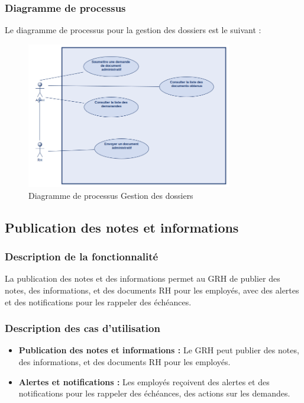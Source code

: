 \subsubsection{Diagramme de processus}
Le diagramme de processus pour la gestion des dossiers est le suivant :
\begin{figure}[H]
    \centering
    \includegraphics[width=0.8\textwidth]{images/diagrammes/flowcharts/dossiers.png}
    \caption{Diagramme de processus Gestion des dossiers}
    \label{fig:flow_gestion_dossiers}
\end{figure}
\subsection{Publication des notes et informations}
\subsubsection{Description de la fonctionnalité}
La publication des notes et des informations permet au GRH de publier des notes, des informations, et des documents RH pour les employés, avec des alertes et des notifications pour les rappeler des échéances.
\subsubsection{Description des cas d'utilisation}   
\begin{itemize}
    \item \textbf{Publication des notes et informations :} Le GRH peut publier des notes, des informations, et des documents RH pour les employés.
    \item \textbf{Alertes et notifications :} Les employés reçoivent des alertes et des notifications pour les rappeler des échéances, des actions sur les demandes.
\end{itemize}
